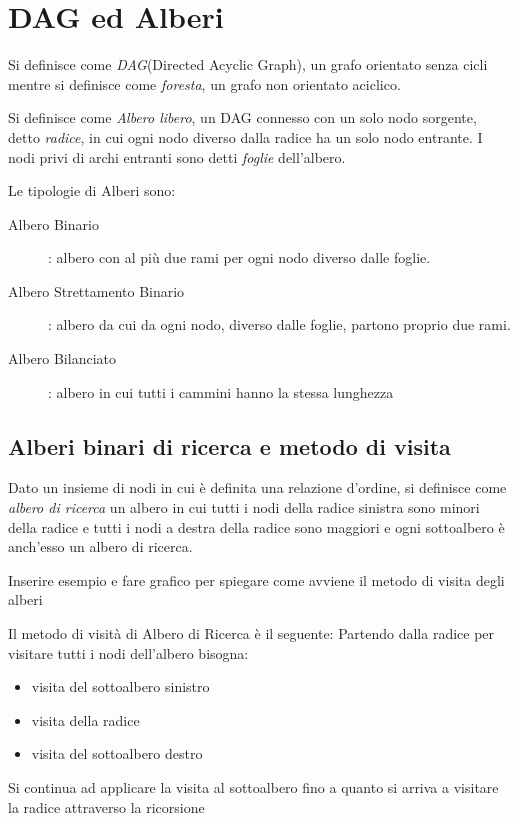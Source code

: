 \section{DAG ed Alberi}
Si definisce come \emph{DAG}(Directed Acyclic Graph), un grafo orientato senza cicli
mentre si definisce come \emph{foresta}, un grafo non orientato aciclico.

Si definisce come \emph{Albero libero}, un DAG connesso con un solo nodo sorgente, detto \emph{radice},
in cui ogni nodo diverso dalla radice ha un solo nodo entrante.\newline
I nodi privi di archi entranti sono detti \emph{foglie} dell'albero.


Le tipologie di Alberi sono:
\begin{description}
    \item[Albero Binario]: albero con al più due rami per ogni nodo diverso dalle foglie.
    \item[Albero Strettamento Binario]: albero da cui da ogni nodo, diverso dalle foglie, partono proprio due rami.
    \item[Albero Bilanciato]: albero in cui tutti i cammini hanno la stessa lunghezza
\end{description}



\subsection{Alberi binari di ricerca e metodo di visita}
Dato un insieme di nodi in cui è definita una relazione d'ordine, si definisce come
\emph{albero di ricerca} un albero in cui tutti i nodi della radice sinistra sono
minori della radice e tutti i nodi a destra della radice sono maggiori e ogni sottoalbero
è anch'esso un albero di ricerca.

Inserire esempio e fare grafico per spiegare come avviene il metodo di visita degli alberi

Il metodo di visità di Albero di Ricerca è il seguente:\newline
Partendo dalla radice per visitare tutti i nodi dell'albero bisogna:
\begin{itemize}
    \item visita del sottoalbero sinistro
    \item visita della radice
    \item visita del sottoalbero destro
\end{itemize}
Si continua ad applicare la visita al sottoalbero fino a quanto si arriva a visitare la radice
attraverso la ricorsione

